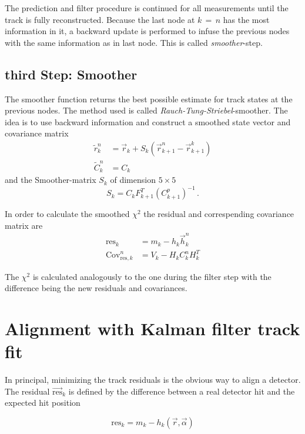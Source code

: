 The prediction and filter procedure is continued for all measurements until the track is fully reconstructed.
Because the last node at $k \, = \, n$ has the most information in it, a backward update is performed to infuse the previous nodes with the same information as in last node.
This is called \textit{smoother}-step.

\subsection{third Step: Smoother}
The smoother function returns the best possible estimate for track states at
the previous nodes. The method used is called \textit{Rauch-Tung-Striebel}-smoother\cite{RTS}.
The idea is to use backward information and construct a smoothed state vector and covariance matrix
\begin{align*}
  \tilde{r}_k^n &= \vec{r}_k + S_k \left( \vec{r}_{k+1}^n - \vec{r}_{k+1}^k \right) \\
  \tilde{C}_k^n &= C_k
\end{align*}
and the Smoother-matrix $S_k$ of dimension $5\times5$
\begin{equation*}
  S_k = C_k F_{k+1}^T \left( C_{k+1}^p \right)^{-1}\,.
\end{equation*}

In order to calculate the smoothed $\chi^2$ the residual and correspending covariance matrix are
\begin{align*}
  \text{res}_k &= m_k - h_k \vec{h}_k^n \\
  \text{Cov}_{\text{res},k}^n &= V_k - H_k C_k^n H_k^T
\end{align*}

The $\chi^2$ is calculated analogously to the one during the filter step with the difference being the new residuals and covariances.

\section{Alignment with Kalman filter track fit}
\label{sec:derivatives}

In principal, minimizing the track residuals is the obvious way to align a detector.
The residual $\vec{\text{res}}_k$ is defined by the difference between a real detector hit and the expected hit position

\begin{equation}
  \text{res}_k = m_k - h_k(\vec{r},\vec{\alpha})
\end{equation}

